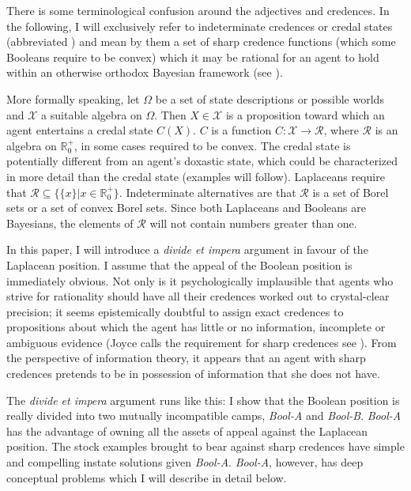 \documentclass[11pt]{article}
\newcommand{\anderson}[0]{\textit{Bool-A}}
\newcommand{\augustin}[0]{\textit{Bool-B}}
\begin{document}
There is some terminological confusion around the adjectives
  and  credences.
In the following, I will exclusively refer to indeterminate credences
or credal states (abbreviated ) and mean by them a set
of sharp credence functions (which some Booleans require to be convex)
which it may be rational for an agent to hold within an otherwise
orthodox Bayesian framework (see ). 

More formally speaking, let $\Omega$ be a set of state descriptions or
possible worlds and $\mathcal{X}$ a suitable algebra on $\Omega$. Then
$X\in\mathcal{X}$ is a proposition toward which an agent entertains a
credal state $C(X)$. $C$ is a function
$C:\mathcal{X}\rightarrow\mathcal{R}$, where $\mathcal{R}$ is an
algebra on $\mathbb{R}^{+}_{0}$, in some cases required to be convex.
The credal state is potentially different from an agent's doxastic
state, which could be characterized in more detail than the credal
state (examples will follow). Laplaceans require that
$\mathcal{R}\subseteq\{\{x\}|x\in\mathbb{R}^{+}_{0}\}$. Indeterminate
alternatives are that $\mathcal{R}$ is a set of Borel sets or a set of
convex Borel sets. Since both Laplaceans and Booleans are Bayesians,
the elements of $\mathcal{R}$ will not contain numbers greater than
one.

In this paper, I will introduce a \emph{divide et impera}
argument in favour of the Laplacean position. I assume that the appeal
of the Boolean position is immediately obvious. Not only is it
psychologically implausible that agents who strive for rationality
should have all their credences worked out to crystal-clear precision;
it seems epistemically doubtful to assign exact credences to
propositions about which the agent has little or no information,
incomplete or ambiguous evidence (Joyce calls the requirement for
sharp credences  see ). From
the perspective of information theory, it appears that an agent with
sharp credences pretends to be in possession of information that she
does not have.

The \emph{divide et impera} argument runs like this: I show that the
Boolean position is really divided into two mutually incompatible
camps, {\anderson} and {\augustin}. 
{\anderson} has the advantage of owning all the assets of appeal
against the Laplacean position. The stock examples brought to bear
against sharp credences have simple and compelling instate solutions
given {\anderson}. {\anderson}, however, has deep conceptual problems
which I will describe in detail below.
\end{document}
